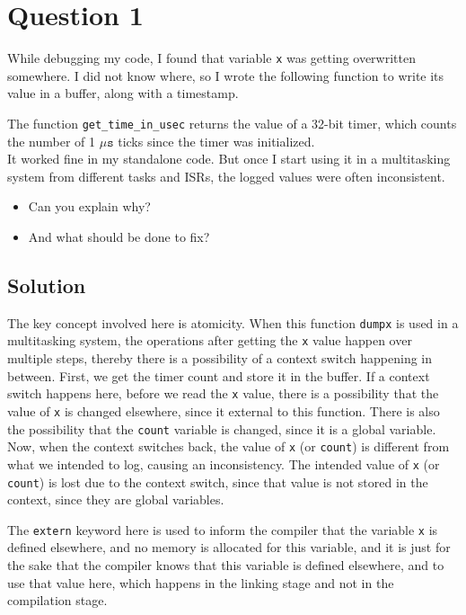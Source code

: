 \section*{Question 1}

While debugging my code, I found that variable \texttt{x} was getting overwritten somewhere.
I did not know where, so I wrote the following function to write its value in a buffer, along with a timestamp.

The function \texttt{get\_time\_in\_usec} returns the value of a 32-bit timer, which counts the number of 1 \( \mu \texttt{s} \) ticks since the timer was initialized. \\
It worked fine in my standalone code.
But once I start using it in a multitasking system from different tasks and ISRs, the logged values were often inconsistent.
\begin{itemize}[noitemsep, topsep=0pt, leftmargin=*]
    \item Can you explain why?
    \item And what should be done to fix?
\end{itemize}

\clearpage
\subsection*{Solution}

The key concept involved here is atomicity.
When this function \texttt{dumpx} is used in a multitasking system, the operations after getting the \texttt{x} value happen over multiple steps, thereby there is a possibility of a context switch happening in between.
First, we get the timer count and store it in the buffer.
If a context switch happens here, before we read the \texttt{x} value, there is a possibility that the value of \texttt{x} is changed elsewhere, since it external to this function.
There is also the possibility that the \texttt{count} variable is changed, since it is a global variable.
Now, when the context switches back, the value of \texttt{x} (or \texttt{count}) is different from what we intended to log, causing an inconsistency.
The intended value of \texttt{x} (or \texttt{count}) is lost due to the context switch, since that value is not stored in the context, since they are global variables.

The \texttt{extern} keyword here is used to inform the compiler that the variable \texttt{x} is defined elsewhere, and no memory is allocated for this variable, and it is just for the sake that the compiler knows that this variable is defined elsewhere, and to use that value here, which happens in the linking stage and not in the compilation stage.

